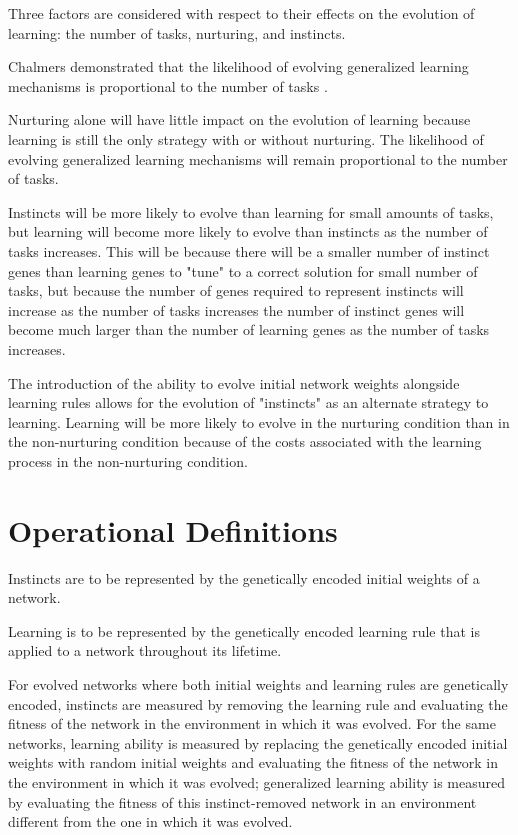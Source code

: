 \documentclass[master]{outhesis}
\begin{document}
Three factors are considered with respect to their effects on the evolution of learning: the number of tasks, nurturing, and instincts.

Chalmers demonstrated that the likelihood of evolving generalized learning mechanisms is proportional to the number of tasks .

Nurturing alone will have little impact on the evolution of learning because learning is still the only strategy with or without nurturing. The likelihood of evolving generalized learning mechanisms will remain proportional to the number of tasks.

Instincts will be more likely to evolve than learning for small amounts of tasks, but learning will become more likely to evolve than instincts as the number of tasks increases. This will be because there will be a smaller number of instinct genes than learning genes to "tune" to a correct solution for small number of tasks, but because the number of genes required to represent instincts will increase as the number of tasks increases the number of instinct genes will become much larger than the number of learning genes as the number of tasks increases.

The introduction of the ability to evolve initial network weights alongside learning rules allows for the evolution of "instincts" as an alternate strategy to learning. Learning will be more likely to evolve in the nurturing condition than in the non-nurturing condition because of the costs associated with the learning process in the non-nurturing condition. 

\chapter{Operational Definitions}

Instincts are to be represented by the genetically encoded initial weights of a network.

Learning is to be represented by the genetically encoded learning rule that is applied to a network throughout its lifetime.

For evolved networks where both initial weights and learning rules are genetically encoded, instincts are measured by removing the learning rule and evaluating the fitness of the network in the environment in which it was evolved.
For the same networks, learning ability is measured by replacing the genetically encoded initial weights with random initial weights and evaluating the fitness of the network in the environment in which it was evolved; generalized learning ability is measured by evaluating the fitness of this instinct-removed network in an environment different from the one in which it was evolved.
\end{document}
